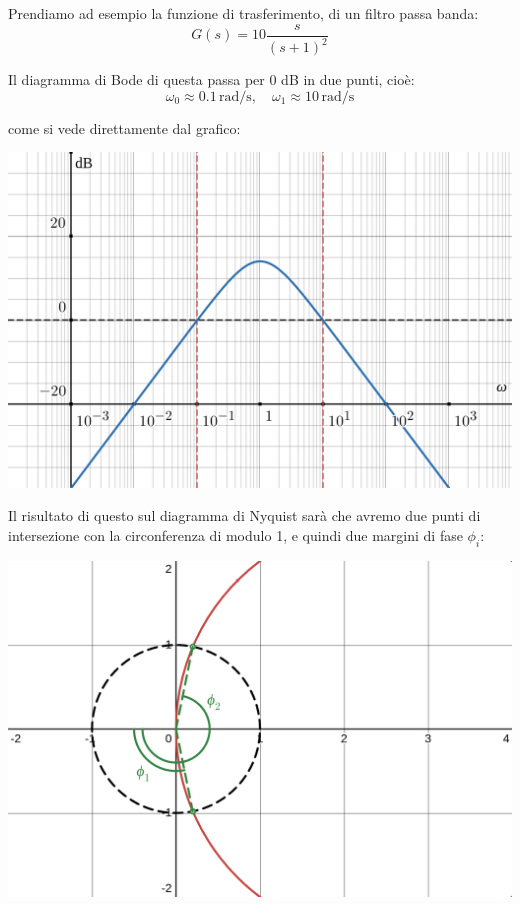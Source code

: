 \documentclass[a4paper,11pt]{article}
\begin{document}
Prendiamo ad esempio la funzione di trasferimento, di un filtro passa banda:
$$
G(s) = 10\frac{s}{(s+1)^2}
$$

Il diagramma di Bode di questa passa per 0 dB in due punti, cioè:
$$
\omega_0 \approx 0.1 \, \mathrm{rad/s}, \quad \omega_1 \approx 10 \, \mathrm{rad/s}
$$

\noindent
\begin{minipage}{\textwidth}

come si vede direttamente dal grafico:
\begin{center}
	\includegraphics[scale=0.28]{../figures/double_intersect_bode.png}
\end{center}

\end{minipage}

\par\medskip

Il risultato di questo sul diagramma di Nyquist sarà che avremo due punti di intersezione con la circonferenza di modulo 1, e quindi due margini di fase $\phi_i$:
\begin{center}
	\includegraphics[scale=0.28]{../figures/double_intersect_nyquist.png}
\end{center}
\end{document}
